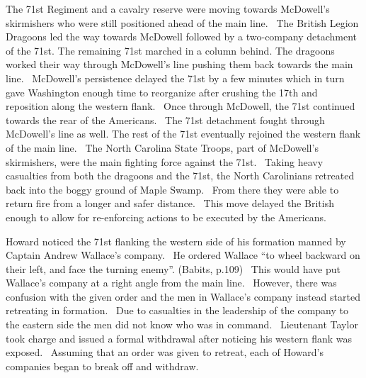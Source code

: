 The 71st Regiment and a cavalry reserve were moving towards McDowell’s
skirmishers who were still positioned ahead of the main line.  The British
Legion Dragoons led the way towards McDowell followed by a two-company
detachment of the 71st.  The remaining 71st marched in a column behind.  The
dragoons worked their way through McDowell’s line pushing them back towards the
main line.  McDowell’s persistence delayed the 71st by a few minutes which in
turn gave Washington enough time to reorganize after crushing the 17th and
reposition along the western flank.  Once through McDowell, the 71st continued
towards the rear of the Americans.  The 71st detachment fought through
McDowell’s line as well.  The rest of the 71st eventually rejoined the western
flank of the main line.  The North Carolina State Troops, part of McDowell’s
skirmishers, were the main fighting force against the 71st.  Taking heavy
casualties from both the dragoons and the 71st, the North Carolinians retreated
back into the boggy ground of Maple Swamp.  From there they were able to return
fire from a longer and safer distance.  This move delayed the British enough to
allow for re-enforcing actions to be executed by the Americans. 

Howard noticed the 71st flanking the western side of his formation manned by
Captain Andrew Wallace’s company.  He ordered Wallace “to wheel backward on
their left, and face the turning enemy”. (Babits, p.109)  This would have put
Wallace’s company at a right angle from the main line.  However, there was
confusion with the given order and the men in Wallace’s company instead started
retreating in formation.  Due to casualties in the leadership of the company to
the eastern side the men did not know who was in command.  Lieutenant Taylor
took charge and issued a formal withdrawal after noticing his western flank was
exposed.  Assuming that an order was given to retreat, each of Howard’s
companies began to break off and withdraw.  

